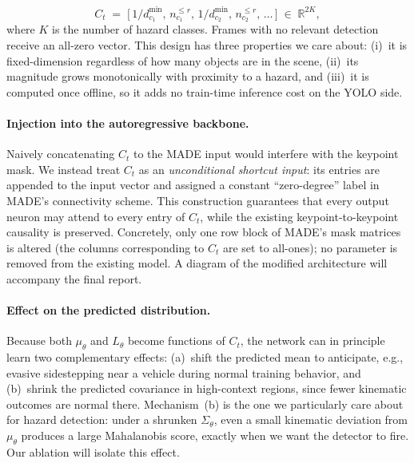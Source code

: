 \documentclass{article}
\begin{document}
\begin{equation}
C_t \;=\; \big[\,1/d^{\min}_{c_1},\,n^{\le r}_{c_1},\,
                 1/d^{\min}_{c_2},\,n^{\le r}_{c_2},\,\dots\,\big]
\;\in\;\mathbb{R}^{2K},
\end{equation}
where $K$ is the number of hazard classes. Frames with no relevant
detection receive an all-zero vector. This design has three properties we
care about: (i)~it is fixed-dimension regardless of how many objects are in
the scene, (ii)~its magnitude grows monotonically with proximity to a
hazard, and (iii)~it is computed once offline, so it adds no train-time
inference cost on the YOLO side.

\paragraph{Injection into the autoregressive backbone.}
Naively concatenating $C_t$ to the MADE input would interfere with the
keypoint mask. We instead treat $C_t$ as an \emph{unconditional shortcut
input}: its entries are appended to the input vector and assigned a
constant ``zero-degree'' label in MADE's connectivity scheme. This
construction guarantees that every output neuron may attend to every entry
of $C_t$, while the existing keypoint-to-keypoint causality is preserved.
Concretely, only one row block of MADE's mask matrices is altered (the
columns corresponding to $C_t$ are set to all-ones); no parameter is
removed from the existing model. A diagram of the modified architecture
will accompany the final report.

\paragraph{Effect on the predicted distribution.}
Because both $\mu_{\theta}$ and $L_{\theta}$ become functions of $C_t$, the
network can in principle learn two complementary effects: (a)~shift the
predicted mean to anticipate, e.g., evasive sidestepping near a vehicle
during normal training behavior, and (b)~shrink the predicted covariance in
high-context regions, since fewer kinematic outcomes are normal there.
Mechanism~(b) is the one we particularly care about for hazard detection:
under a shrunken $\Sigma_{\theta}$, even a small kinematic deviation
from $\mu_{\theta}$ produces a large Mahalanobis score, exactly when we
want the detector to fire. Our ablation will isolate this effect.
\end{document}
